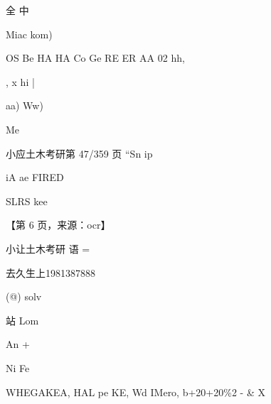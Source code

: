 \documentclass[UTF8,12pt,a4paper,openany]{ctexbook}
\begin{document}
\begin{enumerate}[label=\textbf{\arabic*.},leftmargin=2em]
\par 全  中\par Miac kom)\par OS Be HA HA Co Ge RE ER AA 02 hh,\par ,    x hi                   |\par aa) Ww)\par Me\par 小应土木考研第 47/359 页                            “Sn ip\par iA ae FIRED\par SLRS kee\par \par 【第 6 页，来源：ocr】\par 小让土木考研 语     =\par 去久生上1981387888\par (@)             solv\par 站                 Lom\par An             +\par Ni                 Fe\par WHEGAKEA, HAL pe KE, Wd IMero, b+20+20\%2 - \& X
\end{enumerate}
\end{document}
